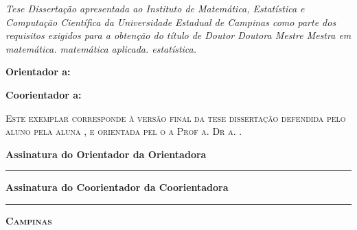 \vfill
\begin{flushright}
  \begin{minipage}[c]{.5\textwidth}
    \textit{\ifx\mestrado\undefined
    Tese
    \else
    Dissertação
    \fi
    apresentada ao Instituto de Matemática,
    Estatística e Computação Científica da Universidade
    Estadual de Campinas como parte dos requisitos exigidos
    para a obtenção do título de
    \ifx\mestrado\undefined
    \ifx\femaleAuthor\undefined
    Doutor
    \else
    Doutora
    \fi
    \else
    \ifx\femaleAuthor\undefined
    Mestre
    \else
    Mestra
    \fi
    \fi
    em
    \ifx\matematica\undefined
    \else
    matemática.
    \fi
    \ifx\aplicada\undefined
    \else
    matemática aplicada.
    \fi
    \ifx\estatistica\undefined
    \else
    estatística.
    \fi
    }
  \end{minipage}
\end{flushright}
\vspace{.5cm}

\noindent
\textbf{Orientador\ifx\femaleOrientador\undefined
\else
a\fi: \orientador
}
\vspace{.25cm}

\ifx\coorientador\undefined
\else
\noindent
\textbf{Coorientador\ifx\femaleCoorientador\undefined
\else
a\fi: \coorientador
}
\vspace{.5cm}
\fi

\noindent
\begin{minipage}[c]{.5\textwidth}
  {\footnotesize\textsc{Este exemplar corresponde à versão final da
  \ifx\mestrado\undefined
  tese
  \else
  dissertação
  \fi
  defendida
  \ifx\femaleAuthor\undefined
  pelo aluno
  \else
  pela aluna
  \fi
  \autor,
  e orientada pel\ifx\femaleOrientador\undefined
  o\else
  a\fi{} Prof\ifx\femaleOrientador\undefined
  \else
  a\fi. Dr\ifx\femaleOrientador\undefined
  \else
  a\fi. \orientador.
  }}
\end{minipage}
\vspace{.5cm}

\noindent
{\small\textbf{Assinatura
\ifx\femaleOrientador\undefined
do Orientador
\else
da Orientadora
\fi
}

\vspace{.3cm}
\noindent
\rule[1pt]{7cm}{.5pt}  %
}
\vspace{.4cm}

\ifx\coorientador\undefined
\else
\noindent
{\small\textbf{Assinatura
\ifx\femaleCoorientador\undefined
do Coorientador
\else
da Coorientadora
\fi
}

\vspace{.3cm}
\noindent
\rule[1pt]{7cm}{.5pt}  %
}
\fi
\vfill
\begin{center}
  {\small\textbf{\textsc{ Campinas \\ \ano}}}
\end{center}
